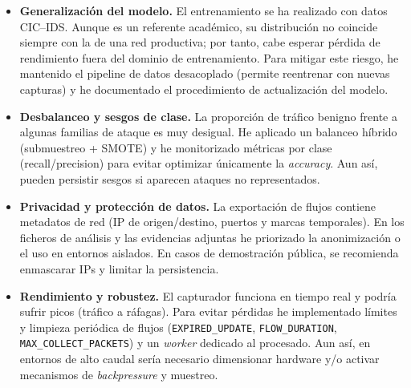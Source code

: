 \begin{itemize}
  \item \textbf{Generalización del modelo.} El entrenamiento se ha realizado con datos CIC--IDS. Aunque es un referente académico, su distribución no coincide siempre con la de una red productiva; por tanto, cabe esperar pérdida de rendimiento fuera del dominio de entrenamiento. Para mitigar este riesgo, he mantenido el pipeline de datos desacoplado (permite reentrenar con nuevas capturas) y he documentado el procedimiento de actualización del modelo.

  \item \textbf{Desbalanceo y sesgos de clase.} La proporción de tráfico benigno frente a algunas familias de ataque es muy desigual. He aplicado un balanceo híbrido (submuestreo + SMOTE) y he monitorizado métricas por clase (recall/precision) para evitar optimizar únicamente la \emph{accuracy}. Aun así, pueden persistir sesgos si aparecen ataques no representados.

  \item \textbf{Privacidad y protección de datos.} La exportación de flujos contiene metadatos de red (IP de origen/destino, puertos y marcas temporales). En los ficheros de análisis y las evidencias adjuntas he priorizado la anonimización o el uso en entornos aislados. En casos de demostración pública, se recomienda enmascarar IPs y limitar la persistencia.

  \item \textbf{Rendimiento y robustez.} El capturador funciona en tiempo real y podría sufrir picos (tráfico a ráfagas). Para evitar pérdidas he implementado límites y limpieza periódica de flujos (\texttt{EXPIRED\_UPDATE}, \texttt{FLOW\_DURATION}, \texttt{MAX\_COLLECT\_PACKETS}) y un \emph{worker} dedicado al procesado. Aun así, en entornos de alto caudal sería necesario dimensionar hardware y/o activar mecanismos de \emph{backpressure} y muestreo.
\end{itemize}